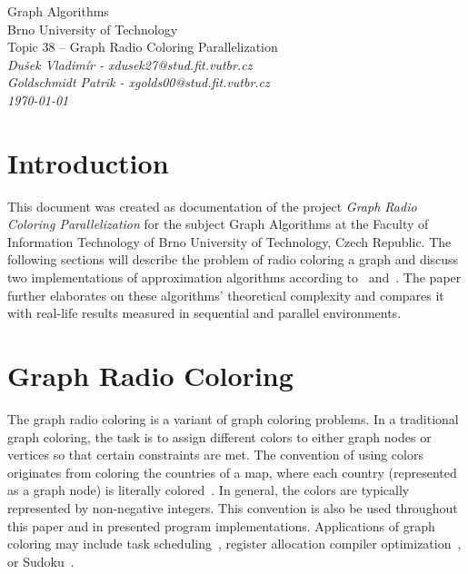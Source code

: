 \documentclass[11pt,a4paper]{article}
\begin{document}
\begin{center}
   {\Huge Graph Algorithms} \\[1.25em]
   {\huge Brno University of Technology} \\[1.25em]
   {\huge Topic 38 -- Graph Radio Coloring Parallelization} \\[1.6em]
   {\Large \textit{Dušek Vladimír - xdusek27@stud.fit.vutbr.cz}} \\[0.7em]
   {\Large \textit{Goldschmidt Patrik - xgolds00@stud.fit.vutbr.cz}} \\[0.7em]
   {\Large \textit{\today}}
\end{center}


\section{Introduction}
\label{sec:intro}

This document was created as documentation of the project \emph{Graph Radio Coloring Parallelization} for the subject Graph Algorithms at the Faculty of Information Technology of Brno University of Technology, Czech Republic. The following sections will describe the problem of radio coloring a graph and discuss two implementations of approximation algorithms according to~\cite{laxman2012_radio_k-coloring} and~\cite{deo2003_parallel_radiocoloring}. The paper further elaborates on these algorithms' theoretical complexity and compares it with real-life results measured in sequential and parallel environments.


\section{Graph Radio Coloring}
\label{sec:graph_radio_coloring}

The graph radio coloring is a variant of graph coloring problems. In a traditional graph coloring, the task is to assign different colors to either graph nodes or vertices so that certain constraints are met. The convention of using colors originates from coloring the countries of a map, where each country (represented as a graph node) is literally colored~\cite{wiki_graphcoloring}. In general, the colors are typically represented by non-negative integers. This convention is also be used throughout this paper and in presented program implementations. Applications of graph coloring may include task scheduling~\cite{marx2003_graphcolouring}, register allocation compiler optimization~\cite{chaitin1982_regalloc}, or Sudoku~\cite{rosenhouse2012_sudoku}.
\end{document}
